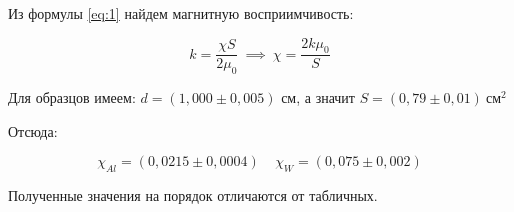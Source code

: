 \documentclass[a4paper,12pt]{article}
\begin{document}
Из формулы \eqref{eq:1} найдем магнитную восприимчивость:

\begin{equation*}
    k = \frac{\chi S}{2 \mu_0} \ \implies \ \chi = \frac{2 k \mu_0}{S}
\end{equation*}

Для образцов имеем: $d = (1,000 \pm 0,005)$ см, а значит $S = (0,79 \pm 0,01) \ \text{см}^2$

Отсюда:

\begin{equation*}
    \chi_{Al} = (0,0215 \pm 0,0004) \ \ \ \ \  \chi_{W} = (0,075 \pm 0,002)
\end{equation*}

Полученные значения на порядок отличаются от табличных.
\end{document}
